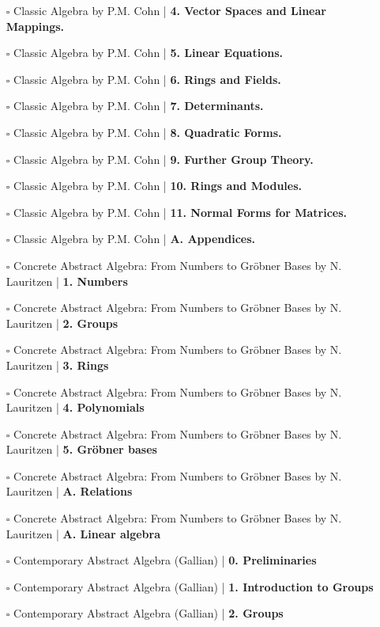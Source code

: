 \documentclass[a4, landscape, 12pt]{article}
\newcommand{\checkbox}{$\square$}%
\begin{document}
\begin{itemize}
{}
\item [\checkbox] Classic Algebra by P.M. Cohn  | \textbf{4. Vector Spaces and Linear Mappings.
}
\item [\checkbox] Classic Algebra by P.M. Cohn  | \textbf{5. Linear Equations.
}
\item [\checkbox] Classic Algebra by P.M. Cohn  | \textbf{6. Rings and Fields.
}
\item [\checkbox] Classic Algebra by P.M. Cohn  | \textbf{7. Determinants.
}
\item [\checkbox] Classic Algebra by P.M. Cohn  | \textbf{8. Quadratic Forms.
}
\item [\checkbox] Classic Algebra by P.M. Cohn  | \textbf{9. Further Group Theory.
}
\item [\checkbox] Classic Algebra by P.M. Cohn  | \textbf{10. Rings and Modules.
}
\item [\checkbox] Classic Algebra by P.M. Cohn  | \textbf{11. Normal Forms for Matrices.
}
\item [\checkbox] Classic Algebra by P.M. Cohn  | \textbf{A. Appendices.
}
\item [\checkbox] Concrete Abstract Algebra: From Numbers to Gröbner Bases by N. Lauritzen  | \textbf{1. Numbers
}
\item [\checkbox] Concrete Abstract Algebra: From Numbers to Gröbner Bases by N. Lauritzen  | \textbf{2. Groups
}
\item [\checkbox] Concrete Abstract Algebra: From Numbers to Gröbner Bases by N. Lauritzen  | \textbf{3. Rings
}
\item [\checkbox] Concrete Abstract Algebra: From Numbers to Gröbner Bases by N. Lauritzen  | \textbf{4. Polynomials
}
\item [\checkbox] Concrete Abstract Algebra: From Numbers to Gröbner Bases by N. Lauritzen  | \textbf{5. Gröbner bases
}
\item [\checkbox] Concrete Abstract Algebra: From Numbers to Gröbner Bases by N. Lauritzen  | \textbf{A. Relations
}
\item [\checkbox] Concrete Abstract Algebra: From Numbers to Gröbner Bases by N. Lauritzen  | \textbf{A. Linear algebra
}
\item [\checkbox] Contemporary Abstract Algebra (Gallian)  | \textbf{0. Preliminaries
}
\item [\checkbox] Contemporary Abstract Algebra (Gallian)  | \textbf{1. Introduction to Groups
}
\item [\checkbox] Contemporary Abstract Algebra (Gallian)  | \textbf{2. Groups
}

\end{itemize}
\end{document}
